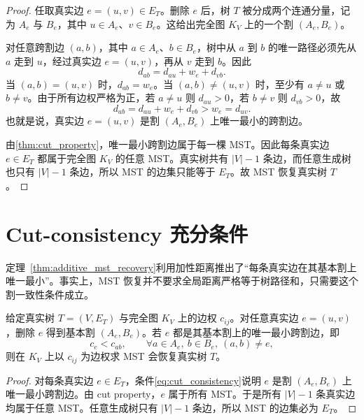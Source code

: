 \begin{proof}
任取真实边 $e=(u,v)\in E_T$。删除 $e$ 后，树 $T$ 被分成两个连通分量，记为 $A_e$ 与 $B_e$，其中 $u\in A_e$、$v\in B_e$。这给出完全图 $K_V$ 上的一个割 $(A_e,B_e)$。

对任意跨割边 $(a,b)$，其中 $a\in A_e$、$b\in B_e$，树中从 $a$ 到 $b$ 的唯一路径必须先从 $a$ 走到 $u$，经过真实边 $e=(u,v)$，再从 $v$ 走到 $b$。因此
\begin{equation}
  d_{ab}=d_{au}+w_e+d_{vb}.
  \label{eq:cut_decomposition}
\end{equation}
当 $(a,b)=(u,v)$ 时，$d_{ab}=w_e$。当 $(a,b)\ne (u,v)$ 时，至少有 $a\ne u$ 或 $b\ne v$。由于所有边权严格为正，若 $a\ne u$ 则 $d_{au}>0$，若 $b\ne v$ 则 $d_{vb}>0$，故
\begin{equation}
  d_{ab}=d_{au}+w_e+d_{vb}>w_e=d_{uv}.
\end{equation}
也就是说，真实边 $e=(u,v)$ 是割 $(A_e,B_e)$ 上唯一最小的跨割边。

由\cref{thm:cut_property}，唯一最小跨割边属于每一棵 MST。因此每条真实边 $e\in E_T$ 都属于完全图 $K_V$ 的任意 MST。真实树共有 $|V|-1$ 条边，而任意生成树也只有 $|V|-1$ 条边，所以 MST 的边集只能等于 $E_T$。故 MST 恢复真实树 $T$。
\end{proof}

\section{Cut-consistency 充分条件}

定理~\ref{thm:additive_mst_recovery}利用加性距离推出了“每条真实边在其基本割上唯一最小”。事实上，MST 恢复并不要求全局距离严格等于树路径和，只需要这个割一致性条件成立。

\begin{theorem}
\label{thm:cut_consistency}
给定真实树 $T=(V,E_T)$ 与完全图 $K_V$ 上的边权 $c_{ij}$。对任意真实边 $e=(u,v)$，删除 $e$ 得到基本割 $(A_e,B_e)$。若 $e$ 都是其基本割上的唯一最小跨割边，即
\begin{equation}
  c_e < c_{ab},\qquad
  \forall a\in A_e,\ b\in B_e,\ (a,b)\ne e,
  \label{eq:cut_consistency}
\end{equation}
则在 $K_V$ 上以 $c_{ij}$ 为边权求 MST 会恢复真实树 $T$。
\end{theorem}

\begin{proof}
对每条真实边 $e\in E_T$，条件\eqref{eq:cut_consistency}说明 $e$ 是割 $(A_e,B_e)$ 上唯一最小跨割边。由 cut property，$e$ 属于所有 MST。于是所有 $|V|-1$ 条真实边均属于任意 MST。任意生成树只有 $|V|-1$ 条边，所以 MST 的边集必为 $E_T$。
\end{proof}

